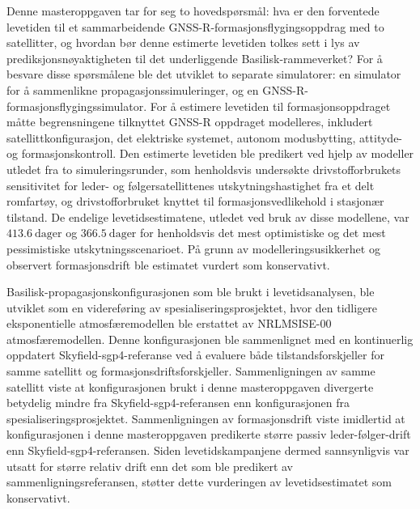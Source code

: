 Denne masteroppgaven tar for seg to hovedspørsmål: hva er den forventede levetiden til et sammarbeidende GNSS-R-formasjonsflygingsoppdrag med to satellitter, og hvordan bør denne estimerte  levetiden tolkes sett i lys av prediksjonsnøyaktigheten til det underliggende Basilisk-rammeverket? For å besvare disse spørsmålene ble det utviklet to separate simulatorer: en simulator for å sammenlikne propagasjonssimuleringer, og en GNSS-R-formasjonsflygingssimulator. For å estimere levetiden til formasjonsoppdraget måtte begrensningene tilknyttet GNSS-R oppdraget modelleres, inkludert satellittkonfigurasjon, det elektriske systemet, autonom modusbytting, attityde- og formasjonskontroll. Den estimerte levetiden ble predikert ved hjelp av modeller utledet fra to simuleringsrunder, som henholdsvis undersøkte drivstofforbrukets sensitivitet for leder- og følgersatellittenes utskytningshastighet fra et delt romfartøy, og drivstofforbruket knyttet til formasjonsvedlikehold i stasjonær tilstand. De endelige levetidsestimatene, utledet ved bruk av disse modellene, var $413.6~\mathrm{dager}$ og $366.5~\mathrm{dager}$ for henholdsvis det mest optimistiske og det mest pessimistiske utskytningsscenarioet. På grunn av modelleringsusikkerhet og observert formasjonsdrift ble estimatet vurdert som konservativt.
 
Basilisk-propagasjonskonfigurasjonen som ble brukt i levetidsanalysen, ble utviklet som en videreføring av spesialiseringsprosjektet, hvor den tidligere eksponentielle atmosfæremodellen ble erstattet av NRLMSISE-00  atmosfæremodellen. Denne konfigurasjonen ble sammenlignet med en kontinuerlig oppdatert Skyfield-\gls{sgp4}-referanse ved å evaluere både tilstandsforskjeller for samme satellitt og formasjonsdriftsforskjeller. Sammenligningen av samme satellitt viste at konfigurasjonen brukt i denne masteroppgaven divergerte betydelig mindre fra Skyfield-\gls{sgp4}-referansen enn konfigurasjonen fra spesialiseringsprosjektet. Sammenligningen av formasjonsdrift viste imidlertid at konfigurasjonen i denne masteroppgaven predikerte større passiv leder-følger-drift enn Skyfield-\gls{sgp4}-referansen. Siden levetidskampanjene dermed sannsynligvis var utsatt for større relativ drift enn det som ble predikert av sammenligningsreferansen, støtter dette vurderingen av levetidsestimatet som konservativt.
